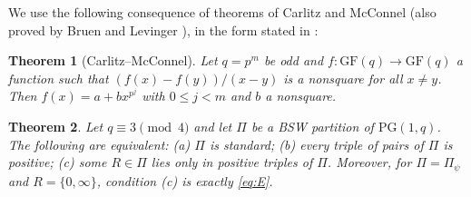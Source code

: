 \documentclass[11pt,a4paper]{article}
\newtheorem{theorem}{Theorem}
\theoremstyle{definition}
\theoremstyle{remark}
\newcommand{\GF}{\mathrm{GF}}
\newcommand{\PG}{\mathrm{PG}}
\begin{document}
We use the following consequence of theorems of Carlitz \cite{Carlitz} and McConnel \cite{McConnel} (also proved by
Bruen and Levinger \cite{BL}), in the form stated in \cite[p.~145, ``Result'']{BSW}:

\begin{theorem}[Carlitz--McConnel]\label{thm:CM}
Let $q=p^m$ be odd and $f:\GF(q)\to\GF(q)$ a function such that $(f(x)-f(y))/(x-y)$ is a nonsquare for all
$x\ne y$. Then $f(x)=a+bx^{p^j}$ with $0\le j<m$ and $b$ a nonsquare.
\end{theorem}

\begin{theorem}\label{thm:red2}
Let $q\equiv3\pmod4$ and let $\Pi$ be a BSW partition of $\PG(1,q)$. The following are equivalent:
(a) $\Pi$ is standard; (b) every triple of pairs of $\Pi$ is positive; (c) some $R\in\Pi$ lies only in positive
triples of $\Pi$. Moreover, for $\Pi=\Pi_\psi$ and $R=\{0,\infty\}$, condition (c) is exactly \eqref{eq:E}.
\end{theorem}
\end{document}
